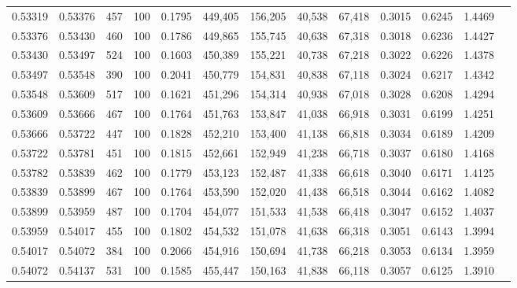 \begin{tabular}{rrrrrrrrrrrrr}
0.53319 & 0.53376 &   457 & 100 &                                     0.1795 & 449,405 & 156,205 &  40,538 &  67,418 & 0.3015 & 0.6245 & 1.4469 \\
0.53376 & 0.53430 &   460 & 100 &                                     0.1786 & 449,865 & 155,745 &  40,638 &  67,318 & 0.3018 & 0.6236 & 1.4427 \\
0.53430 & 0.53497 &   524 & 100 &                                     0.1603 & 450,389 & 155,221 &  40,738 &  67,218 & 0.3022 & 0.6226 & 1.4378 \\
0.53497 & 0.53548 &   390 & 100 &                                     0.2041 & 450,779 & 154,831 &  40,838 &  67,118 & 0.3024 & 0.6217 & 1.4342 \\
0.53548 & 0.53609 &   517 & 100 &                                     0.1621 & 451,296 & 154,314 &  40,938 &  67,018 & 0.3028 & 0.6208 & 1.4294 \\
0.53609 & 0.53666 &   467 & 100 &                                     0.1764 & 451,763 & 153,847 &  41,038 &  66,918 & 0.3031 & 0.6199 & 1.4251 \\
0.53666 & 0.53722 &   447 & 100 &                                     0.1828 & 452,210 & 153,400 &  41,138 &  66,818 & 0.3034 & 0.6189 & 1.4209 \\
0.53722 & 0.53781 &   451 & 100 &                                     0.1815 & 452,661 & 152,949 &  41,238 &  66,718 & 0.3037 & 0.6180 & 1.4168 \\
0.53782 & 0.53839 &   462 & 100 &                                     0.1779 & 453,123 & 152,487 &  41,338 &  66,618 & 0.3040 & 0.6171 & 1.4125 \\
0.53839 & 0.53899 &   467 & 100 &                                     0.1764 & 453,590 & 152,020 &  41,438 &  66,518 & 0.3044 & 0.6162 & 1.4082 \\
0.53899 & 0.53959 &   487 & 100 &                                     0.1704 & 454,077 & 151,533 &  41,538 &  66,418 & 0.3047 & 0.6152 & 1.4037 \\
0.53959 & 0.54017 &   455 & 100 &                                     0.1802 & 454,532 & 151,078 &  41,638 &  66,318 & 0.3051 & 0.6143 & 1.3994 \\
0.54017 & 0.54072 &   384 & 100 &                                     0.2066 & 454,916 & 150,694 &  41,738 &  66,218 & 0.3053 & 0.6134 & 1.3959 \\
0.54072 & 0.54137 &   531 & 100 &                                     0.1585 & 455,447 & 150,163 &  41,838 &  66,118 & 0.3057 & 0.6125 & 1.3910 \\

\end{tabular}

